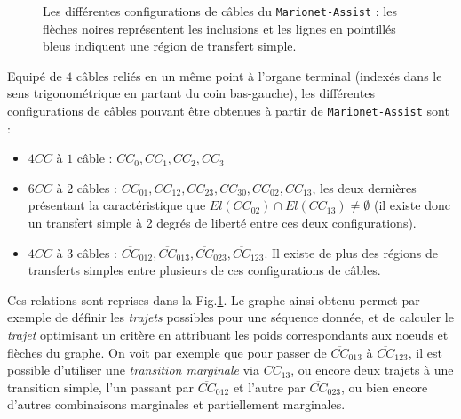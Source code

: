 \begin{figure}[!ht]
  \centering
    \def\svgwidth{.65\linewidth}
  
    \caption{\footnotesize{Les diff\'erentes configurations de c\^ables du 
{\tt Marionet-Assist} : les fl\`eches noires repr\'esentent les inclusions et 
les lignes en pointill\'es bleus indiquent une r\'egion de transfert simple.}}
\label{chap01:fig0}
\end{figure}

Equip\'e de $4$ c\^ables reli\'es en un m\^eme point \`a l'organe 
terminal (index\'es dans le sens trigonom\'etrique en partant du coin 
bas-gauche), les diff\'erentes confi\-gurations de c\^ables pouvant \^etre 
obtenues \`a partir de {\tt Marionet-Assist} sont :
\begin{itemize}
 \item $4 CC$ \`a $1$ c\^able : $CC_0, CC_1, CC_2, CC_3$
  \item $6 CC$ \`a $2$ c\^ables : $CC_{01}, CC_{12}, CC_{23}, CC_{30}, CC_{02}, 
CC_{13}$, les deux derni\`eres pr\'esentant la caract\'eristique que 
$El(CC_{02}) \cap El(CC_{13}) \neq \emptyset$ (il existe donc un transfert 
simple \`a 2 degr\'es de libert\'e entre ces deux configurations).
  \item $4 CC$ \`a $3$ c\^ables : $\overline{CC}_{012}, \overline{CC}_{013}, 
\overline{CC}_{023}, \overline{CC}_{123}$. Il existe de plus des r\'egions de 
transferts simples entre plusieurs de ces configurations de c\^ables.
\end{itemize}

Ces relations sont reprises dans la Fig.\ref{chap01:fig0}. Le graphe ainsi 
obtenu permet par exemple de d\'efinir les {\it trajets} possibles pour une 
s\'equence donn\'ee, et de calculer le {\it trajet} optimisant un crit\`ere en 
attribuant les poids correspondants aux noeuds et fl\`eches du graphe. On voit 
par exemple que pour passer de $\overline{CC}_{013}$ \`a $\overline{CC}_{123}$, 
il est possible d'utiliser une {\it transition marginale} via $CC_{13}$, ou 
encore deux trajets \`a une transition simple, l'un passant par 
$\overline{CC}_{012}$ et l'autre par $\overline{CC}_{023}$, ou bien encore 
d'autres combinaisons marginales et partiellement marginales.

